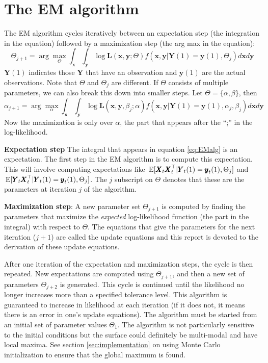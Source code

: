 \documentclass[]{article}
\def\XX{\mbox{$\pmb{X}$}}	\def\xx{\mbox{$\pmb{x}$}}
\def\YY{\mbox{$\pmb{Y}$}}	\def\yy{\mbox{$\pmb{y}$}}
\def\LL{\mbox{$\pmb{L}$}}	\def\ll{\mbox{$\pmb{l}$}}
\def\E{\,\textup{\textrm{E}}}
\begin{document}
\section{The EM algorithm}\label{sec:EMalgorithm}
The EM algorithm cycles iteratively between an expectation step (the integration in the equation) followed by a maximization step (the arg max in the equation):
\begin{equation}\label{eq:EMalg}
\Theta_{j+1} = \arg \underset{\Theta}{\max} \int_{\xx}{\int_{\yy}{\log\LL(\xx,\yy;\Theta) f(\xx,\yy|\YY(1)=\yy(1),\Theta_j)d\xx d\yy}}
\end{equation}
$\YY(1)$ indicates those $\YY$ that have an observation and $\yy(1)$ are the actual observations. Note that $\Theta$ and $\Theta_j$ are different.  If $\Theta$ consists of multiple parameters, we can also break this down into smaller steps.  Let $\Theta=\{\alpha,\beta\}$, then
\begin{equation}\label{eq:EMalg.j}
\alpha_{j+1} = \arg \underset{\alpha}{\max} \int_{\xx}{\int_{\yy}{\log\LL(\xx,\yy,\beta_j;\alpha) f(\xx,\yy|\YY(1)=\yy(1),\alpha_j,\beta_j)d\xx d\yy}}
\end{equation}
Now the maximization is only over $\alpha$, the part that appears after the ``;'' in the log-likelihood.

\textbf{Expectation step} The integral that appears in equation \ref{eq:EMalg} is an expectation. The first step in the EM algorithm is to compute this expectation.  This will involve computing expectations like $\E[\XX_t\XX_t^\top|\YY_t(1)=\yy_t(1),\Theta_j]$ and $\E[\YY_t\XX_t^\top|\YY_t(1)=\yy_t(1),\Theta_j]$. The $j$ subscript on $\Theta$ denotes that these are the parameters at iteration $j$ of the algorithm.

\textbf{Maximization step}: A new parameter set $\Theta_{j+1}$ is computed by finding the parameters that maximize the \textit{expected} log-likelihood function (the part in the integral) with respect to $\Theta$.  The equations that give the parameters for the next iteration ($j+1$) are called the update equations and this report is devoted to the derivation of these update equations.

After one iteration of the expectation and maximization steps, the cycle is then repeated. New expectations  are computed using $\Theta_{j+1}$, and then a new set of parameters $\Theta_{j+2}$ is generated.  This cycle is continued until the likelihood no longer increases more than a specified tolerance level.   This algorithm is guaranteed to increase in likelihood at each iteration (if it does not, it means there is an error in one's update equations).  The algorithm must be started from an initial set of parameter values $\Theta_1$.  The algorithm is not particularly sensitive to the initial conditions but the surface could definitely be multi-modal and have local maxima.  See section \ref{sec:implementation} on using Monte Carlo initialization to ensure that the global maximum is found.
\end{document}
